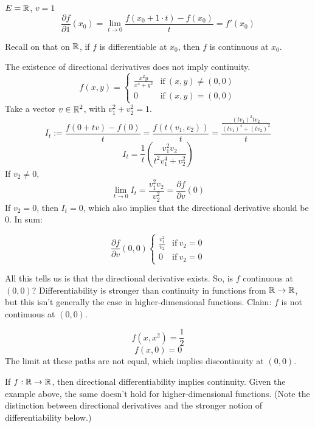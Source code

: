 \documentclass[11pt]{article}
\newcommand{\ra}{\rightarrow}
\begin{document}
\begin{example}
    $E = \mathbb{R}$, $v = 1$
    \[\frac{\partial f}{\partial 1}(x_0) = \lim_{t \ra 0}\frac{f(x_0 + 1\cdot t)-f(x_0)}{t}= f'(x_0)\] 
\end{example}

Recall on that on $\mathbb{R}$, if $f$ is differentiable at $x_0$, then $f$ is continuous at $x_0$. 
\begin{example}
    The existence of directional derivatives does not imply continuity. 
    \[f(x,y) = 
    \begin{cases}
        \frac{x^2y}{x^4 + y^2} & \text{if} \ (x,y) \neq (0,0) \\
        0 & \text{if} \ (x,y) = (0,0)
    \end{cases}
    \]
    Take a vector $v \in \mathbb{R}^2$, with $v_1^2 + v_2^2 = 1$. 
    \[I_t := \frac{f(0 + tv) - f(0)}{t} = \frac{f(t(v_1, v_2))}{t} = \frac{\frac{(tv_1)^2 tv_2}{(tv_1)^4 + (tv_2)^2}}{t}\]
    \[I_t = \frac{1}{t}(\frac{v_1^2v_2}{t^2v_1^4 + v_2^2})\]
    If $v_2 \neq 0$, \[\lim_{t \ra 0} I_t = \frac{v_1^2v_2}{v_2^2} = \frac{\partial f}{\partial v} (0)\]
    If $v_2 = 0$, then $I_t = 0$, which also implies that the directional derivative should be $0$. In sum: 

    \[\frac{\partial f}{\partial v} (0,0)
    \begin{cases}
        \frac{v_1^2}{v_2} & \text{if} \ v_2 = 0 \\
        0 & \text{if} \ v_2 = 0
    \end{cases} \]
    
    All this tells us is that the directional derivative exists. So, is $f$ continuous at $(0,0)$? Differentiability is stronger than continuity in functions from $\R \ra \R$, but this isn't generally the case in higher-dimensional functions. Claim: $f$ is not continuous at $(0,0)$. 

    \[f(x,x^2) = \frac{1}{2}\]
    \[f(x,0) = 0\]
    The limit at these paths are not equal, which implies discontinuity at $(0,0)$. 

\end{example}

\begin{remark}
    If $f:\R \ra \R$, then directional differentiability implies continuity. Given the example above, the same doesn't hold for higher-dimensional functions. (Note the distinction between directional derivatives and the stronger notion of differentiability below.)
\end{remark}
\end{document}
